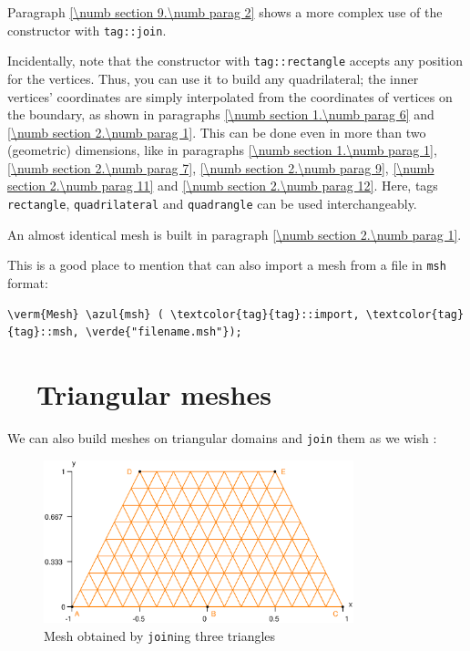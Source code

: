 Paragraph \ref{\numb section 9.\numb parag 2} shows a more complex use of the
{\small\tt {}} constructor with {\small\tt \textcolor{tag}{tag}::join}.

Incidentally, note that the {\small\tt {}} constructor with
{\small\tt \textcolor{tag}{tag}::rectangle} accepts any position for the vertices. 
Thus, you can use it to build any quadrilateral; the inner vertices' coordinates are simply
interpolated from the coordinates of vertices on the boundary, as shown in paragraphs
\ref{\numb section 1.\numb parag 6} and \ref{\numb section 2.\numb parag 1}.
This can be done even in more than two (geometric) dimensions, like in
paragraphs \ref{\numb section 1.\numb parag 1}, \ref{\numb section 2.\numb parag 7},
\ref{\numb section 2.\numb parag 9}, \ref{\numb section 2.\numb parag 11} and
\ref{\numb section 2.\numb parag 12}.
Here, tags {\small\tt rectangle}, {\small\tt quadrilateral} and {\small\tt quadrangle}
can be used interchangeably.

An almost identical mesh is built in paragraph \ref{\numb section 2.\numb parag 1}.

This is a good place to mention that {\maniFEM} can also import a mesh from a file
in {\small\tt msh} format:

\begin{Verbatim}[commandchars=\\\{\},formatcom=\small\tt,baselinestretch=0.94]
   \verm{Mesh} \azul{msh} ( \textcolor{tag}{tag}::import, \textcolor{tag}{tag}::msh, \verde{"filename.msh"});
\end{Verbatim}


\section{~~Triangular meshes}\label{\numb section 1.\numb parag 5}

We can also build meshes on triangular domains and {\small\tt join} them as we wish :

\begin{figure}[ht] \centering
  \includegraphics[width=90mm]{three-tri}
  \caption{Mesh obtained by {\small\tt join}ing three triangles}
  \label{\numb section 1.\numb fig 7}
\end{figure}


